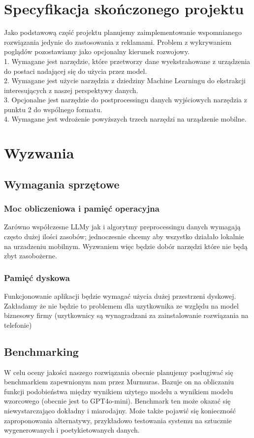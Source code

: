 \documentclass[12pt]{article}
\begin{document}
\section*{Specyfikacja skończonego projektu}
Jako podstawową część projektu planujemy zaimplementowanie wspomnianego rozwiązania jedynie do zastosowania z reklamami. Problem z wykrywaniem poglądów pozostawiamy jako opcjonalny kierunek rozwojowy.\\
1. Wymagane jest narzędzie, które przetworzy dane wyekstrahowane z urządzenia do postaci nadającej się do użycia przez model. \\
2. Wymagane jest użycie narzędzia z dziedziny Machine Learningu do ekstrakcji interesujących z naszej perspektywy danych. \\
3. Opcjonalne jest narzędzie do postprocessingu danych wyjściowych narzędzia z punktu 2 do wspólnego formatu. \\
4. Wymagane jest wdrożenie powyższych trzech narzędzi na urządzenie mobilne.

\section*{Wyzwania}

\subsection*{Wymagania sprzętowe}
\subsubsection*{Moc obliczeniowa i pamięć operacyjna}
Zarówno współczesne LLMy jak i algorytmy preprocessingu danych wymagają często dużej ilości zasobów; jednoczesnie chcemy aby wszystko działało lokalnie na urzadzeniu mobilnym. Wyzwaniem więc będzie dobór narzędzi które nie będą zbyt zasobożerne.

\subsubsection*{Pamięć dyskowa}
Funkcjonowanie aplikacji będzie wymagać użycia dużej przestrzeni dyskowej. Zakładamy że nie będzie to problemem dla uzytkownika ze względu na model biznesowy firmy (uzytkownicy są wynagradzani za zainstalowanie rozwiązania na telefonie)

\subsection*{Benchmarking}
W celu oceny jakości naszego rozwiązania obecnie planujemy posługiwać się benchmarkiem zapewnionym nam przez Murmuras. Bazuje on na obliczaniu funkcji podobieństwa między wynikiem użytego modelu a wynikiem modelu wzorcowego (obecnie jest to GPT4o-mini). Benchmark ten może okazać się niewystarczająco dokładny i miarodajny. Może także pojawić się konieczność zaproponowania alternatywy, przykładowo testowania systemu na sztucznie wygenerowanych i poetykietowanych danych.
\end{document}
